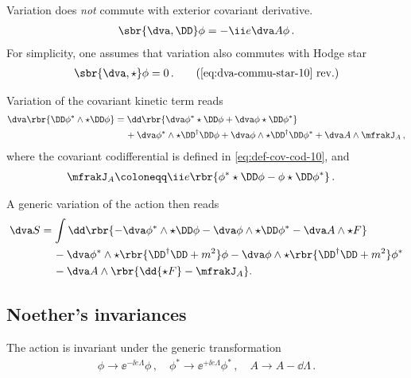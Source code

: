 \documentclass[a4paper]{article}
\begin{document}
Variation does \emph{not} commute with exterior covariant derivative.
\begin{align}
\sbr{\dva, \DD}\phi = -\ii e \dva A\phi\,.
\end{align}
For simplicity, one assumes that variation also commutes with Hodge star
\begin{align}
\sbr{\dva, \star}\phi = 0\,.
\tag{\ref{eq:dva-commu-star-10} rev.}
\end{align}

Variation of the covariant kinetic term reads
\begin{align}
\begin{split}
\dva \rbr{\DD \phi^*\wedge\star\DD\phi} &= 
\dd\rbr{\dva\phi^* \star\DD\phi + \dva\phi \star\DD\phi^*} 
\\ &\quad\,+
	\dva\phi^*\wedge\star\DD^{\dagger}\DD\phi +
	\dva\phi\wedge\star\DD^{\dagger}\DD\phi^* +
	\dva A \wedge \mfrakJ_A \,,
\end{split}
\end{align}
where the covariant codifferential is defined in \cref{eq:def-cov-cod-10}, and
\begin{align}
\mfrakJ_A &\coloneqq 
	\ii e \rbr{\phi^* \star\DD\phi - \phi\star\DD\phi^*}\,.
\end{align}

A generic variation of the action then reads
\begin{align}
\dva S &=
\int \dd\rbr{-\dva\phi^*\wedge\star\DD\phi -
\dva\phi\wedge\star\DD\phi^* - \dva A \wedge\star F}
\nonumber \\
&\quad\,-
\dva\phi^*\wedge\star\rbr{\DD^{\dagger}\DD + m^2}\phi -
\dva\phi\wedge\star\rbr{\DD^{\dagger}\DD + m^2}\phi^*
\nonumber \\
&\quad\,-
\dva A\wedge\rbr{\dd{\star F} - \mfrakJ_{A}}.
\end{align}


\subsection{Noether's invariances}


The action is invariant under the generic transformation
\begin{align}
\phi \to \ee^{-\ii e \Lambda} \phi\,,\quad
\phi^* \to \ee^{+\ii e \Lambda} \phi^*\,,\quad
A \to A - \dd \Lambda\,.
\end{align}
\end{document}
